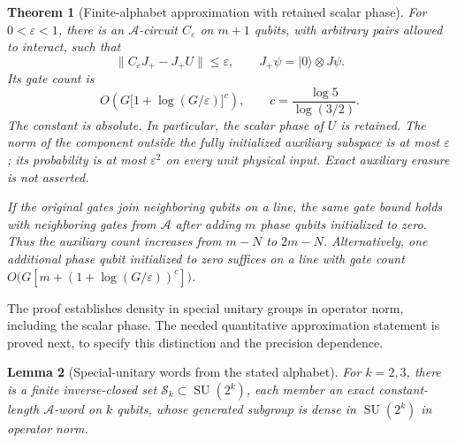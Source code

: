 \documentclass[11pt]{article}
\newtheorem{theorem}{Theorem}
\newtheorem{lemma}[theorem]{Lemma}
\begin{document}
\begin{theorem}[Finite-alphabet approximation with retained scalar phase]
\label{thm:finite-gate-phase-lift}
For $0<\varepsilon<1$, there is an $\mathcal A$-circuit $C_\varepsilon$
on $m+1$ qubits, with arbitrary pairs allowed to interact, such that
\begin{equation}\label{eq:finite-gate-input-error}
 \|C_\varepsilon J_+-J_+U\|\leq\varepsilon,
 \qquad J_+\psi=|0\rangle\otimes J\psi.
\end{equation}
Its gate count is
\begin{equation}\label{eq:finite-gate-count}
 O\left(G\bigl[1+\log(G/\varepsilon)\bigr]^c\right),
 \qquad c=\frac{\log5}{\log(3/2)}.
\end{equation}
The constant is absolute. In particular, the scalar phase of $U$ is retained.
The norm of the component outside the fully initialized auxiliary subspace
is at most $\varepsilon$; its probability is at most $\varepsilon^2$ on
every unit physical input. Exact auxiliary erasure is not asserted.

If the original gates join neighboring qubits on a line, the same gate bound
holds with neighboring gates from $\mathcal A$ after adding $m$ phase
qubits initialized to zero. Thus the auxiliary count increases from $m-N$ to $2m-N$.
Alternatively, one additional phase qubit initialized to zero suffices on
a line with gate count
$O\bigl(G[m+(1+\log(G/\varepsilon))^c]\bigr)$.
\end{theorem}

The proof establishes density in special unitary groups in operator norm,
including the scalar phase. The needed quantitative approximation statement is
proved next, to specify this distinction and the precision dependence.

\begin{lemma}[Special-unitary words from the stated alphabet]
\label{lem:finite-gate-su-density}
For $k=2,3$, there is a finite inverse-closed set $\mathcal S_k\subset
\operatorname{SU}(2^k)$, each member an exact constant-length
$\mathcal A$-word on $k$ qubits, whose generated subgroup is dense in
$\operatorname{SU}(2^k)$ in operator norm.
\end{lemma}
\end{document}
